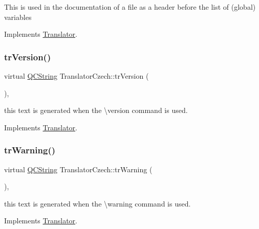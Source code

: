This is used in the documentation of a file as a header before the list of (global) variables 

Implements \mbox{\hyperlink{class_translator}{Translator}}.

\mbox{\label{class_translator_czech_a74c2788ae879fbf24882f83c23ab3d4a}} 
\subsubsection{\texorpdfstring{trVersion()}{trVersion()}}
{\footnotesize\ttfamily virtual \mbox{\hyperlink{class_q_c_string}{Q\+C\+String}} Translator\+Czech\+::tr\+Version (\begin{DoxyParamCaption}{ }\end{DoxyParamCaption})\hspace{0.3cm}{\ttfamily [inline]}, {\ttfamily [virtual]}}

this text is generated when the \textbackslash{}version command is used. 

Implements \mbox{\hyperlink{class_translator}{Translator}}.

\mbox{\label{class_translator_czech_a90945b94973b4e5da0af7019dfa0c40f}} 
\subsubsection{\texorpdfstring{trWarning()}{trWarning()}}
{\footnotesize\ttfamily virtual \mbox{\hyperlink{class_q_c_string}{Q\+C\+String}} Translator\+Czech\+::tr\+Warning (\begin{DoxyParamCaption}{ }\end{DoxyParamCaption})\hspace{0.3cm}{\ttfamily [inline]}, {\ttfamily [virtual]}}

this text is generated when the \textbackslash{}warning command is used. 

Implements \mbox{\hyperlink{class_translator}{Translator}}.

\mbox{\label{class_translator_czech_a76990cacd056f67d91d4fe784c7bcfca}} 
